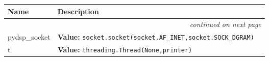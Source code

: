 \begin{longtable}{|p{}|p{}|l}
\cline{1-2}
\cline{1-2} \centering \textbf{Name} & \centering \textbf{Description}& \\
\cline{1-2}
\endhead\cline{1-2}\multicolumn{3}{r}{\small\textit{continued on next page}}\\\endfoot\cline{1-2}
\endlastfoot\raggedright p\-y\-d\-s\-p\-\_\-s\-o\-c\-k\-e\-t\- & \textbf{Value:} 
{\tt s\-o\-c\-k\-e\-t\-.\-s\-o\-c\-k\-e\-t\-(\-s\-o\-c\-k\-e\-t\-.\-A\-F\-\_\-I\-N\-E\-T\-,\-s\-o\-c\-k\-e\-t\-.\-S\-O\-C\-K\-\_\-D\-G\-R\-A\-M\-)\-}&\\
\cline{1-2}
\raggedright t\- & \textbf{Value:} 
{\tt t\-h\-r\-e\-a\-d\-i\-n\-g\-.\-T\-h\-r\-e\-a\-d\-(\-N\-o\-n\-e\-,\-p\-r\-i\-n\-t\-e\-r\-)\-}&\\
\cline{1-2}
\end{longtable}

